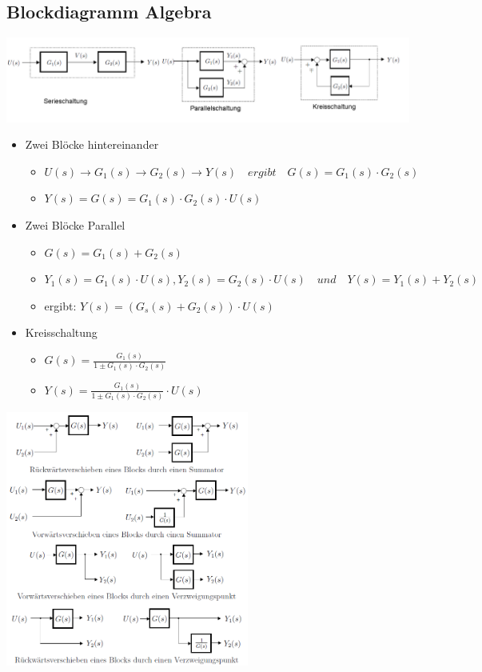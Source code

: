 \subsection{Blockdiagramm Algebra}
\begin{center}
	\includegraphics[width=16cm]{./images/blockdiagrammAlgebra.png}
\end{center}
\begin{itemize}
\item Zwei Blöcke hintereinander 
\begin{itemize}
	\item $U(s) \longrightarrow G_1(s)\longrightarrow G_2(s) \longrightarrow Y(s) \quad ergibt  \quad G(s)=G_1(s)\cdot G_2(s)$
	\item $Y(s) = G(s)=G_1(s)\cdot G_2(s) \cdot U(s)$
\end{itemize}
\item Zwei Blöcke Parallel
\begin{itemize}
	\item $G(s) = G_1(s) + G_2(s)$
	\item $Y_1(s) = G_1(s)\cdot U(s), Y_2(s) = G_2(s)\cdot U(s) \quad und \quad  Y(s) = Y_1(s)+ Y_2(s)$
	\item ergibt: $Y(s)= (G_s(s)+G_2(s))\cdot U(s)$
\end{itemize}

\item Kreisschaltung
\begin{itemize}
	\item $G(s) = \frac{G_1(s)}{1\pm G_1(s)\cdot G_2(s)}$
	\item $Y(s) = \frac{G_1(s)}{1\pm G_1(s)\cdot G_2(s)} \cdot U(s)$
\end{itemize}
\end{itemize}
\begin{center}
\includegraphics[width=8cm]{./images/blockdiagrammAlgebra2.png}
\end{center}


